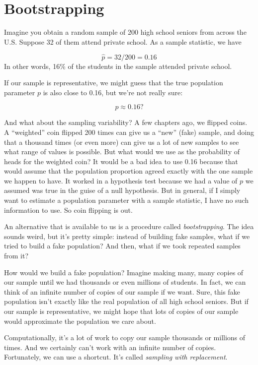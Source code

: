 \documentclass[
]{book}
\begin{document}
\hypertarget{ci-boot}{%
\section{Bootstrapping}\label{ci-boot}}

Imagine you obtain a random sample of 200 high school seniors from across the U.S. Suppose 32 of them attend private school. As a sample statistic, we have

\[
\hat{p} = 32/200 = 0.16
\]
In other words, 16\% of the students in the sample attended private school.

If our sample is representative, we might guess that the true population parameter \(p\) is also close to 0.16, but we're not really sure:

\[
p \approx 0.16?
\]

And what about the sampling variability? A few chapters ago, we flipped coins. A ``weighted'' coin flipped 200 times can give us a ``new'' (fake) sample, and doing that a thousand times (or even more) can give us a lot of new samples to see what range of values is possible. But what would we use as the probability of heads for the weighted coin? It would be a bad idea to use 0.16 because that would assume that the population proportion agreed exactly with the one sample we happen to have. It worked in a hypothesis test because we had a value of \(p\) we assumed was true in the guise of a null hypothesis. But in general, if I simply want to estimate a population parameter with a sample statistic, I have no such information to use. So coin flipping is out.

An alternative that is available to us is a procedure called \emph{bootstrapping}. The idea sounds weird, but it's pretty simple: instead of building fake samples, what if we tried to build a fake population? And then, what if we took repeated samples from it?

How would we build a fake population? Imagine making many, many copies of our sample until we had thousands or even millions of students. In fact, we can think of an infinite number of copies of our sample if we want. Sure, this fake population isn't exactly like the real population of all high school seniors. But if our sample is representative, we might hope that lots of copies of our sample would approximate the population we care about.

Computationally, it's a lot of work to copy our sample thousands or millions of times. And we certainly can't work with an infinite number of copies. Fortunately, we can use a shortcut. It's called \emph{sampling with replacement}.
\end{document}
